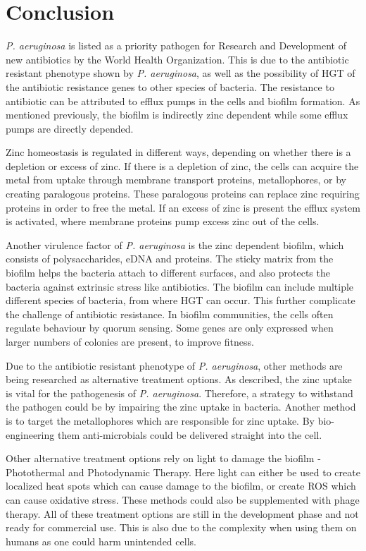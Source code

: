 \section{Conclusion}
\emph{P. aeruginosa} is listed as a priority pathogen for Research and Development of new antibiotics by the World Health Organization. This is due to the antibiotic resistant phenotype shown by \emph{P. aeruginosa}, as well as the possibility of HGT of the antibiotic resistance genes to other species of bacteria. The resistance to antibiotic can be attributed to efflux pumps in the cells and biofilm formation. As mentioned previously, the biofilm is indirectly zinc dependent while some efflux pumps are directly depended.  

Zinc homeostasis is regulated in different ways, depending on whether there is a depletion or excess of zinc. If there is a depletion of zinc, the cells can acquire the metal from uptake through membrane transport proteins, metallophores, or by creating paralogous proteins. These paralogous proteins can replace zinc requiring proteins in order to free the metal. If an excess of zinc is present the efflux system is activated, where membrane proteins pump excess zinc out of the cells. 

Another virulence factor of \textit{P. aeruginosa} is the zinc dependent biofilm, which consists of polysaccharides, eDNA and proteins. The sticky matrix from the biofilm helps the bacteria attach to different surfaces, and also protects the bacteria against extrinsic stress like antibiotics. The biofilm can include multiple different species of bacteria, from where HGT can occur. This further complicate the challenge of antibiotic resistance. In biofilm communities, the cells often regulate behaviour by quorum sensing. Some genes are only expressed when larger numbers of colonies are present, to improve fitness. 

Due to the antibiotic resistant phenotype of \emph{P. aeruginosa}, other methods are being researched as alternative treatment options. As described, the zinc uptake is vital for the pathogenesis of \emph{P. aeruginosa}. Therefore, a strategy to withstand the pathogen could be by impairing the zinc uptake in bacteria. Another method is to target the metallophores which are responsible for zinc uptake. By bio-engineering them anti-microbials could be delivered straight into the cell. 

Other alternative treatment options rely on light to damage the biofilm - Photothermal and Photodynamic Therapy. Here light can either be used to create localized heat spots which can cause damage to the biofilm, or create ROS which can cause oxidative stress. These methods could also be supplemented with phage therapy. All of these treatment options are still in the development phase and not ready for commercial use. This is also due to the complexity when using them on humans as one could harm unintended cells.  
